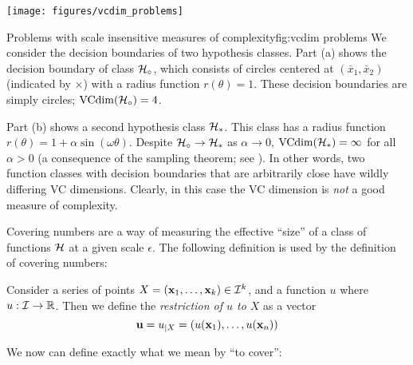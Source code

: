 \begin{linefigure}
\begin{center}
\texttt{[image: figures/vcdim\_problems]}
\end{center}
\begin{capt}{Problems with scale insensitive measures of
complexity}{fig:vcdim problems}
We consider the decision boundaries of two hypothesis classes.  Part
(a) shows the decision boundary of class $\mathcal{H}_{\circ}$,
which consists of circles centered at $(\bar{x}_1, \bar{x}_2)$
(indicated by $\times$) with a radius function $r(\theta) = 1$.  These
decision boundaries are simply circles; $\mathrm{VCdim}(\mathcal{H}_{\circ}) = 4$.

Part (b) shows a second hypothesis class $\mathcal{H}_{\ast}$.  This class
has a radius function $r(\theta) = 1 + \alpha \sin(\omega \theta)$.
Despite $\mathcal{H}_{\circ} \rightarrow \mathcal{H}_{\ast}$ as $\alpha
\rightarrow 0$, $\mathrm{VCdim}(\mathcal{H}_{\ast}) = \infty$ for all $\alpha >
0$ (a consequence of the sampling theorem; see \cite{Cherkassky98}).
In other words, two function classes with 
decision boundaries that are arbitrarily close have wildly differing
VC dimensions.  Clearly, in this case the VC dimension is \emph{not} a
good measure of complexity.
\end{capt}
\end{linefigure}

Covering numbers are a way of measuring the effective ``size'' of a
class of functions $\mathcal{H}$ at a given scale $\epsilon$.  The following
definition is used by the definition of covering numbers:

\begin{definition}
\label{def:restriction}
Consider a series of points $X = (\mathbf{x}_1, \ldots, \mathbf{x}_k) \in \mathcal{I}^k$,
and a function $u$ where $u : \mathcal{I} \rightarrow \mathbb{R}$.  Then
we define the \emph{restriction of $u$ to $X$} as a vector
%
\begin{equation}
\mathbf{u} = u_{|X} = (u(\mathbf{x}_1), \ldots, u(\mathbf{x}_n))
\end{equation}
\end{definition}

We now can define exactly what we mean by ``to cover'':

